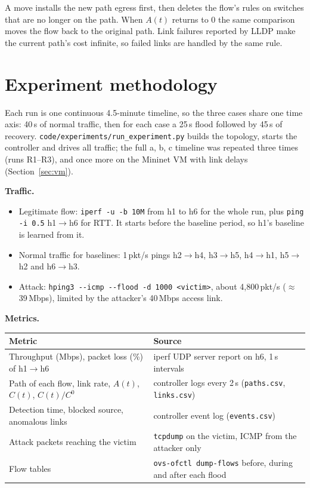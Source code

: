 \documentclass[11pt,a4paper]{article}
\newcommand{\ra}{\ensuremath{\rightarrow}}
\newcommand{\code}[1]{\texttt{#1}}
\begin{document}
A move installs the new path egress first, then deletes the flow's rules on switches that are no longer on the
path. When $A(t)$ returns to 0 the same comparison moves the flow back to the original path. Link failures
reported by LLDP make the current path's cost infinite, so failed links are handled by the same rule.

\section{Experiment methodology}

Each run is one continuous 4.5-minute timeline, so the three cases share one time axis: 40\,s of normal traffic,
then for each case a 25\,s flood followed by 45\,s of recovery. \nolinkurl{code/experiments/run_experiment.py} builds the
topology, starts the controller and drives all traffic; the full a, b, c timeline was repeated three times
(runs R1--R3), and once more on the Mininet VM with link delays (Section~\ref{sec:vm}).

\noindent\textbf{Traffic.}\par
\begin{itemize}
  \item Legitimate flow: \code{iperf -u -b 10M} from h1 to h6 for the whole run, plus \code{ping -i 0.5}
        h1\ra h6 for RTT. It starts before the baseline period, so h1's baseline is learned from it.
  \item Normal traffic for baselines: 1\,pkt/s pings h2\ra h4, h3\ra h5, h4\ra h1, h5\ra h2 and h6\ra h3.
  \item Attack: \code{hping3 -{}-icmp -{}-flood -d 1000 <victim>}, about 4{,}800\,pkt/s ($\approx$\,39\,Mbps),
        limited by the attacker's 40\,Mbps access link.
\end{itemize}

\noindent\textbf{Metrics.}\par
\begin{table}[H]
  \centering
  \small
  \begin{tabularx}{\textwidth}{>{\raggedright\arraybackslash}X >{\raggedright\arraybackslash}X}
    \toprule
    Metric & Source \\
    \midrule
    Throughput (Mbps), packet loss (\%) of h1\ra h6 & iperf UDP server report on h6, 1\,s intervals \\
    Path of each flow, link rate, $A(t)$, $C(t)$, $C(t)/C^0$ & controller logs every 2\,s
      (\code{paths.csv}, \code{links.csv}) \\
    Detection time, blocked source, anomalous links & controller event log (\code{events.csv}) \\
    Attack packets reaching the victim & \code{tcpdump} on the victim, ICMP from the attacker only \\
    Flow tables & \code{ovs-ofctl dump-flows} before, during and after each flood \\
    \bottomrule
  \end{tabularx}
\end{table}
\end{document}
